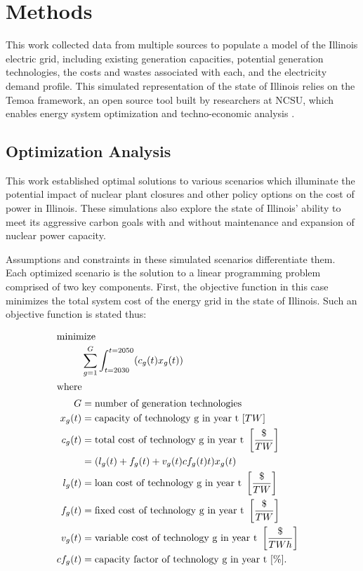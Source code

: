 \section{Methods}\label{sec:methods}
This work collected data from multiple sources to populate a model of the 
Illinois electric grid, including existing generation capacities, potential 
generation technologies, the costs and wastes associated with each, and the 
electricity demand profile. This simulated representation of the state of 
Illinois relies on the Temoa framework, an open source tool built by 
researchers at \gls{NCSU}, which enables energy system optimization and 
techno-economic analysis 
\cite{decarolis_temoa_2010,decarolis_modelling_2016,decarolis_formalizing_2017}.

\subsection{Optimization Analysis}
This work established optimal solutions to 
various scenarios which illuminate the potential impact of nuclear plant 
closures and other policy options on the cost of power in Illinois. These 
simulations  also explore the state of Illinois' ability to meet its aggressive 
carbon goals with and without maintenance and expansion of nuclear power 
capacity. 

Assumptions and constraints in these simulated scenarios differentiate them. 
Each optimized scenario is the solution to a linear programming 
problem  comprised of two key components. First, the objective function in this 
case minimizes the total system cost of the energy grid in the state of 
Illinois. 
Such an objective function is stated thus:

\begin{align}
\intertext{minimize} 
        &\sum_{g=1}^G\int_{t=2030}^{t=2050} (c_g(t)x_g(t))\\
\intertext{where}
        G&=\text{number of generation technologies}&\nonumber\\
        x_g(t)&=\text{capacity of technology g in year t }[TW] &\nonumber\\
        c_g(t)&=\text{total cost of technology g in year t }\left[\frac{\$}{TW}\right]&\nonumber\\
              &= (l_g(t) + f_g(t) + v_g(t)cf_g(t)t)x_g(t)\nonumber\\
        l_g(t)&=\text{loan cost of technology g in year t }\left[\frac{\$}{TW}\right]&\nonumber\\
        f_g(t)&=\text{fixed cost of technology g in year t }\left[\frac{\$}{TW}\right]&\nonumber\\
        v_g(t)&=\text{variable cost of technology g in year t }\left[\frac{\$}{TWh}\right]&\nonumber\\
        cf_g(t)&=\text{capacity factor of technology g in year t }[\%] .&\nonumber
\end{align}

